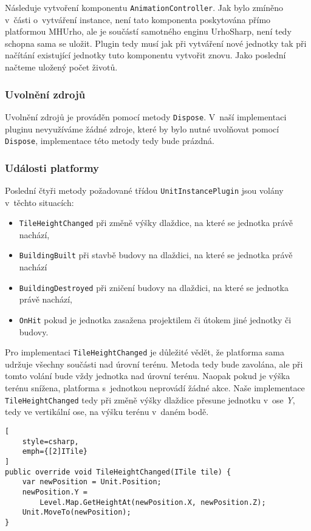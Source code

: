 Následuje vytvoření komponentu \texttt{AnimationController}. Jak bylo zmíněno v~části o~vytváření instance, není tato komponenta poskytována přímo platformou MHUrho, ale je součástí samotného enginu UrhoSharp, není tedy schopna sama se uložit. Plugin tedy musí jak při vytváření nové jednotky tak při načítání existující jednotky tuto komponentu vytvořit znovu. Jako poslední načteme uložený počet životů.

\subsubsection{Uvolnění zdrojů}

Uvolnění zdrojů je prováděn pomocí metody \texttt{Dispose}. V~naší implementaci pluginu nevyužíváme žádné zdroje, které by bylo nutné uvolňovat pomocí \texttt{Dispose}, implementace této metody tedy bude prázdná.


\subsubsection{Události platformy}

Poslední čtyři metody požadované třídou \texttt{UnitInstancePlugin} jsou volány v~těchto situacích:
\begin{itemize}
	\item \texttt{TileHeightChanged} při změně výšky dlaždice, na které se jednotka právě nachází,
	\item \texttt{BuildingBuilt} při stavbě budovy na dlaždici, na které se jednotka právě nachází
	\item \texttt{BuildingDestroyed} při zničení budovy na dlaždici, na které se jednotka právě nachází,
	\item \texttt{OnHit} pokud je jednotka zasažena projektilem či útokem jiné jednotky či budovy.
\end{itemize}


Pro implementaci \texttt{TileHeightChanged} je důležité vědět, že platforma sama udržuje všechny součásti nad úrovní terénu. Metoda tedy bude zavolána, ale při tomto volání bude vždy jednotka nad úrovní terénu. Naopak pokud je výška terénu snížena, platforma s~jednotkou neprovádí žádné akce. Naše implementace \texttt{TileHeightChanged} tedy při změně výšky dlaždice přesune jednotku v~ose \textit{Y}, tedy ve vertikální ose, na výšku terénu v~daném bodě.


\begin{lstlisting}[
	style=csharp,
	emph={[2]ITile}
]
public override void TileHeightChanged(ITile tile) {
	var newPosition = Unit.Position;
	newPosition.Y = 
		Level.Map.GetHeightAt(newPosition.X, newPosition.Z);
	Unit.MoveTo(newPosition);
}
\end{lstlisting}

